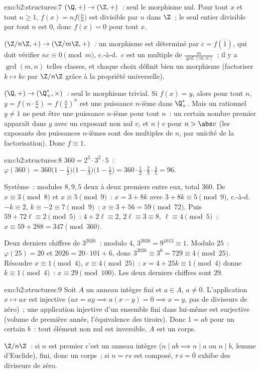 \begin{solution}{exo:b2:structures:7}
\emph{$(\Q,+) \to (\Z,+)$~:} seul le morphisme nul. Pour tout $x$ et
tout $n \geq 1$, $f(x) = n f\bigl(\frac xn\bigr)$ est divisible par
$n$ dans $\Z$~; le seul entier divisible par tout $n$ est $0$, donc
$f(x) = 0$ pour tout $x$.

\emph{$(\Z/n\Z, +) \to (\Z/m\Z, +)$~:} un morphisme est déterminé par
$c = f(\overline 1)$, qui doit vérifier $n c \equiv 0 \pmod m$,
c.-à-d.\ $c$ est un multiple de $\frac{m}{\gcd(m,n)}$~; il y a
$\gcd(m,n)$ telles classes, et chaque choix définit bien un morphisme
(factoriser $k \mapsto kc$ par $\Z/n\Z$ grâce à la propriété
universelle).

\emph{$(\Q, +) \to (\Q_+^*, \times)$~:} seul le morphisme trivial. Si
$f(x) = y$, alors pour tout $n$, $y = f(n \cdot \frac xn) =
f(\frac xn)^n$ est une puissance $n$-ième dans $\Q_+^*$. Mais un
rationnel $y \neq 1$ ne peut être une puissance $n$-ième pour tout
$n$~: un certain nombre premier apparaît dans $y$ avec un exposant non
nul $v$, et $n \nmid v$ pour $n > \abs v$ (les exposants des puissances
$n$-ièmes sont des multiples de $n$, par unicité de la factorisation).
Donc $f \equiv 1$.
\end{solution}

\begin{solution}{exo:b2:structures:8}
$360 = 2^3 \cdot 3^2 \cdot 5$~:
$\varphi(360) = 360\bigl(1 - \tfrac12\bigr)\bigl(1 -
\tfrac13\bigr)\bigl(1 - \tfrac15\bigr) = 360 \cdot \tfrac12 \cdot
\tfrac23 \cdot \tfrac45 = 96$.

Système~: modules $8, 9, 5$ deux à deux premiers entre eux, total
$360$. De $x \equiv 3 \pmod 8$ et $x \equiv 5 \pmod 9$~: $x = 3 + 8k$
avec $3 + 8k \equiv 5 \pmod 9$, c.-à-d.\ $-k \equiv 2$, $k \equiv -2
\equiv 7 \pmod 9$~: $x \equiv 3 + 56 = 59 \pmod{72}$. Puis $59 +
72\ell \equiv 2 \pmod 5$~: $4 + 2\ell \equiv 2$, $2\ell \equiv 3 \equiv
8$, $\ell \equiv 4 \pmod 5$~: $x \equiv 59 + 288 = 347 \pmod{360}$.

Deux derniers chiffres de $3^{2026}$~: modulo $4$, $3^{2026} =
9^{1013} \equiv 1$. Modulo $25$~: $\varphi(25) = 20$ et $2026 =
20\cdot101 + 6$, donc $3^{2026} \equiv 3^6 = 729 \equiv 4 \pmod{25}$.
Résoudre $x \equiv 1 \pmod 4$, $x \equiv 4 \pmod{25}$~: $x = 4 + 25k
\equiv 1 \pmod 4$ donne $k \equiv 1 \pmod 4$~: $x \equiv 29 \pmod{100}$.
Les deux derniers chiffres sont $29$.
\end{solution}

\begin{solution}{exo:b2:structures:9}
Soit $A$ un anneau intègre fini et $a \in A$, $a \neq 0$.
L'application $x \mapsto ax$ est injective ($ax = ay \implies a(x - y)
= 0 \implies x = y$, pas de diviseurs de zéro)~; une application
injective d'un ensemble fini dans lui-même est surjective (volume de
première année, l'équivalence des tiroirs). Donc $1 = ab$ pour un
certain $b$~: tout élément non nul est inversible, $A$ est un corps.

$\Z/n\Z$~: si $n$ est premier c'est un anneau intègre ($n \mid ab
\implies n \mid a$ ou $n \mid b$, lemme d'Euclide), fini, donc un
corps~; si $n = rs$ est composé, $\overline r\,\overline s =
\overline 0$ exhibe des diviseurs de zéro.
\end{solution}

